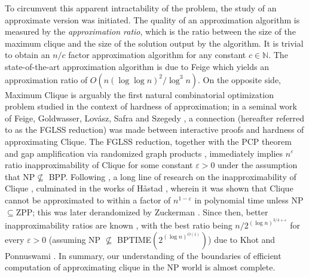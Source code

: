 \documentclass[10pt,a4paper]{article}
\begin{document}
To circumvent this apparent intractability of the problem, the study of an approximate version was initiated. The quality of an approximation algorithm is measured by the \emph{approximation ratio}, which is the ratio between  the size of the maximum clique and the size of the solution output by the algorithm. It is trivial to obtain an $n/c$ factor approximation algorithm for any constant $c\in\mathbb{N}$. The state-of-the-art approximation algorithm is due to Feige \cite{F04} which yields an approximation ratio of $O(n(\log\log n)^2/\log^3 n)$. 
On the opposite side, Maximum Clique is arguably the first natural combinatorial optimization problem studied in the context of hardness of approximation; in a seminal work of Feige, Goldwasser, Lov\'asz, Safra and Szegedy \cite{FGLSS96}, a connection (hereafter referred to as the FGLSS reduction) was made between interactive proofs and hardness of approximating Clique. The FGLSS reduction, together with the PCP theorem \cite{AS98,ALMSS98,D07} and gap amplification via randomized graph products \cite{BS92}, immediately implies $n^\varepsilon$ ratio inapproximability of Clique for some constant $\varepsilon>0$ under the assumption that NP$\not\subseteq$ BPP. Following \cite{FGLSS96},   a long line of research on the inapproximability of Clique \cite{BGLR93,FK00,BGS98,BS94},   culminated in the works of H\r{a}stad  \cite{H96a,H96b}, wherein it was shown that Clique cannot be approximated to within a factor of $n^{1-\varepsilon}$ in polynomial time unless NP$\subseteq$ZPP; this was later derandomized by Zuckerman  \cite{Z07}. Since then, better inapproximability ratios are known \cite{EH00,K01,KP06}, with the best ratio being $n/2^{(\log n)^{3/4+\varepsilon}}$ for every $\varepsilon> 0$ (assuming NP $\nsubseteq$ BPTIME$(2^{(\log n)^{O(1)}})$) due to Khot and Ponnuswami \cite{KP06}. In summary, our understanding of the boundaries of efficient computation of approximating clique in the NP world is almost complete. 
\end{document}
